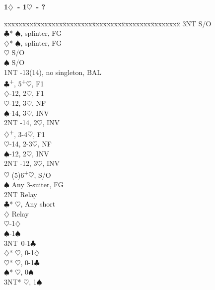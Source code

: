 \documentclass[10pt]{article}
\renewcommand{\c}{$\clubsuit$}
\renewcommand{\d}{$\diamondsuit$}
\newcommand{\h}{$\heartsuit$}
\newcommand{\s}{$\spadesuit$}
\newcommand{\p}{\textsuperscript{+}}
\newenvironment{bidtable}[1][]
{\textbf{#1}
  \begin{adjustwidth}{1em}{}
    \addvspace{2pt}
    \begin{tabbing}
      xxxxxxxx\=xxxxxxxx\=xxxxxxxx\=xxxxxxxx\=xxxxxxxx\=xxxxxxxx\=\kill}
{\end{tabbing}\end{adjustwidth}\bigskip}%
\begin{document}
\begin{multicols*}{2}
\begin{bidtable}[1\d\ - 1\h\ - ?]
     \> 3NT  \> S/O                                     \\
     \c* {}\s, splinter, FG                       \\
     \d* {}\s, splinter, FG                       \\
     \h  \> S/O                                     \\
     \s  \> S/O                                     \\
1NT  -13(14), no singleton, BAL                    \\
     \c  {}\p, 5\p\h, F1                          \\
     \>      \d {}-12, 2\h, F1                   \\
     \>      \h {}-12, 3\h, NF                   \\
     \>      \s {}-14, 3\h, INV                  \\
     \>      \> 2NT -14, 2\h, INV                  \\
     \d  {}\p, 3-4\h, F1                          \\
     \>      \h {}-14, 2-3\h, NF                 \\
     \>      \s {}-12, 2\h, INV                  \\
     \>      \> 2NT -12, 3\h, INV                  \\
     \h  \> (5)6\p\h, S/O                           \\
     \s  \> Any 3-suiter, FG                        \\
     \>      \> 2NT \> Relay                            \\
     \>      \>     \c* {}\h, Any short           \\
     \>      \>     \>      \d \> Relay             \\
     \>      \>     \>      \>     \h{}-1\d      \\
     \>      \>     \>      \>     \s{}-1\s      \\
     \>      \>     \>      \>     \> 3NT\ 0-1\c      \\
     \>      \>     \d* {}\h, 0-1\d               \\
     \>      \>     \h* {}\h, 0-1\c               \\
     \>      \>     \s* {}\h, 0\s                 \\
     \>      \>     \> 3NT* \h, 1\s                 \\

\end{bidtable}
\end{multicols*}
\end{document}
